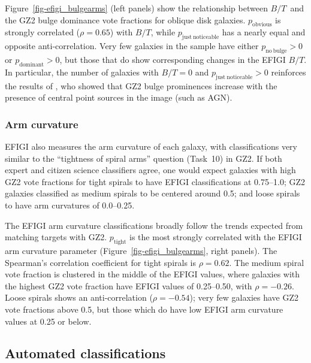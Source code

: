 \documentclass[useAMS,usenatbib]{mn2e}
\newcommand{\bt}{$B/T$}
\begin{document}
Figure~\ref{fig-efigi_bulgearms} (left panels) show the relationship between \bt~and the GZ2 bulge dominance vote fractions for oblique disk galaxies. $p_\mathrm{obvious}$ is strongly correlated ($\rho=0.65$) with \bt, while $p_\mathrm{just~noticeable}$ has a nearly equal and opposite anti-correlation. Very few galaxies in the sample have either $p_\mathrm{no~bulge}>0$ or $p_\mathrm{dominant}>0$, but those that do show corresponding changes in the EFIGI \bt. In particular, the number of galaxies with $B/T=0$ and $p_\mathrm{just~noticeable}>0$ reinforces the results of \citet{sim13}, who showed that GZ2 bulge prominences increase with the presence of central point sources in the image (such as AGN). 

\subsubsection{Arm curvature}

EFIGI also measures the arm curvature of each galaxy, with classifications very similar to the ``tightness of spiral arms'' question (Task~10) in GZ2. If both expert and citizen science classifiers agree, one would expect galaxies with high GZ2 vote fractions for tight spirals to have EFIGI classifications at 0.75--1.0; GZ2 galaxies classified as medium spirals to be centered around 0.5; and loose spirals to have arm curvatures of 0.0--0.25. 

The EFIGI arm curvature classifications broadly follow the trends expected from matching targets with GZ2. $p_\mathrm{tight}$ is the most strongly correlated with the EFIGI arm curvature parameter (Figure~\ref{fig-efigi_bulgearms}, right panels). The Spearman's correlation coefficient for tight spirals is $\rho=0.62$. The medium spiral vote fraction is clustered in the middle of the EFIGI values, where galaxies with the highest GZ2 vote fraction have EFIGI values of 0.25--0.50, with $\rho=-0.26$. Loose spirals shows an anti-correlation ($\rho=-0.54$); very few galaxies have GZ2 vote fractions above 0.5, but those which do have low EFIGI arm curvature values at 0.25 or below. 

\subsection{Automated classifications}
\end{document}
